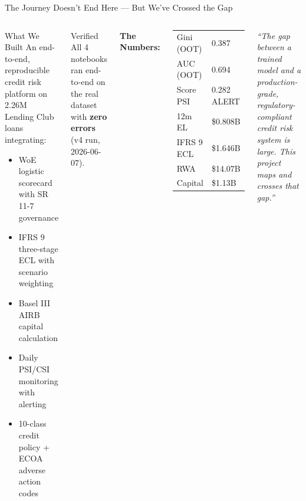 \documentclass[aspectratio=169,11pt]{beamer}
\newcommand{\B}[1]{\textbf{#1}}
\begin{document}
\begin{frame}[shrink=5]{The Journey Doesn't End Here --- But We've Crossed the Gap}
  \begin{columns}[T]
      \begin{block}{What We Built}\small
        An end-to-end, reproducible credit risk platform on 2.26M Lending Club loans integrating:
        \begin{itemize}\small
          \item WoE logistic scorecard with SR 11-7 governance
          \item IFRS 9 three-stage ECL with scenario weighting
          \item Basel III AIRB capital calculation
          \item Daily PSI/CSI monitoring with alerting
          \item 10-class credit policy + ECOA adverse action codes
        \end{itemize}
      \end{block}
      \vspace{4pt}
      \begin{exampleblock}{Verified}\small
        All 4 notebooks ran end-to-end on the real dataset with \B{zero errors} (v4 run, 2026-06-07).
      \end{exampleblock}

      \small\textbf{The Numbers:}
      \begin{center}\small
        \begin{tabular}{ll}
          \toprule
          Gini (OOT) & 0.387 \\
          AUC (OOT)  & 0.694 \\
          Score PSI  & 0.282 \textcolor{alertred}{ALERT}\\
          \midrule
          12m EL     & \$0.808B \\
          IFRS 9 ECL & \$1.646B \\
          RWA        & \$14.07B \\
          Capital    & \$1.13B \\
          \bottomrule
        \end{tabular}
      \end{center}
      \vspace{6pt}
      \small\textit{``The gap between a trained model and a production-grade, regulatory-compliant credit risk system is large. This project maps and crosses that gap.''}
  \end{columns}
\end{frame}
\end{document}
